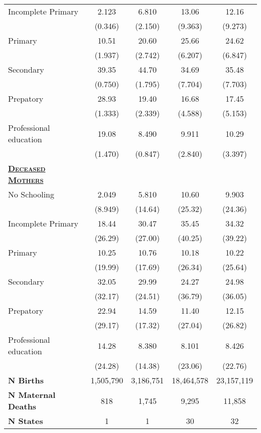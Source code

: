 {\begin{tabular}{lcccc}
 	 
  Incomplete Primary&       2.123&       6.810&       13.06&       12.16\\
	&     (0.346)&     (2.150)&     (9.363)&     (9.273)\\
  Primary&       10.51&       20.60&       25.66&       24.62\\
	&     (1.937)&     (2.742)&     (6.207)&     (6.847)\\
 
  Secondary&       39.35&       44.70&       34.69&       35.48\\
	&     (0.750)&     (1.795)&     (7.704)&     (7.703)\\
  Prepatory&       28.93&       19.40&       16.68&       17.45\\
	&     (1.333)&     (2.339)&     (4.588)&     (5.153)\\
	
  Professional education&       19.08&       8.490&       9.911&       10.29\\
	&     (1.470)&     (0.847)&     (2.840)&     (3.397)\\
	 
  
 \textsc{\textbf{\underline{Deceased Mothers}}}		&&&&\\
 
 
  No Schooling &       2.049&       5.810&       10.60&       9.903\\
	&     (8.949)&     (14.64)&     (25.32)&     (24.36)\\
  Incomplete Primary &       18.44&       30.47&       35.45&       34.32\\
	&     (26.29)&     (27.00)&     (40.25)&     (39.22)\\
  Primary  &       10.25&       10.76&       10.18&       10.22\\
	&     (19.99)&     (17.69)&     (26.34)&     (25.64)\\
  Secondary &       32.05&       29.99&       24.27&       24.98\\
	&     (32.17)&     (24.51)&     (36.79)&     (36.05)\\
  Prepatory &       22.94&       14.59&       11.40&       12.15\\
	&     (29.17)&     (17.32)&     (27.04)&     (26.82)\\
  Professional education &       14.28&       8.380&       8.101&       8.426\\
	&     (24.28)&     (14.38)&     (23.06)&     (22.76)\\\hline
\textbf{N Births}& 1,505,790 & 3,186,751& 18,464,578& 23,157,119  \\ 
\textbf{N Maternal Deaths}& 818 & 1,745 & 9,295 & 11,858\\
\textbf{N States} & 1&1&30&32\\
 	\hline\hline
\end{tabular}}
 
 
 